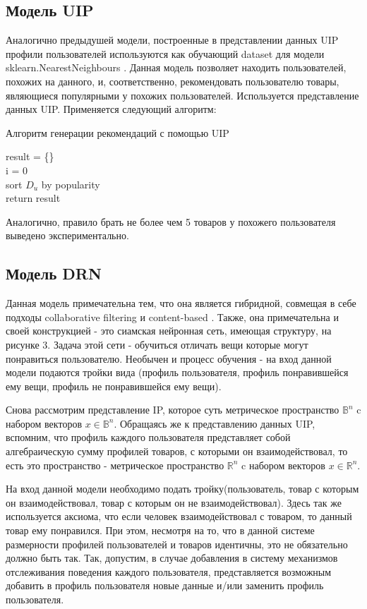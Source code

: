 \documentclass[14pt]{mmcs_article}
\begin{document}
\subsection{Модель UIP}
Аналогично предыдушей модели, построенные в представлении данных UIP профили пользователей используются как обучающий dataset для модели sklearn.NearestNeighbours \cite{IP:a1}. Данная модель позволяет находить пользователей, похожих на данного, и, соответственно, рекомендовать пользователю товары, являющиеся популярными у похожих пользователей. Используется представление данных UIP.
Применяется следующий алгоритм:

\begin{algorithm}[H]\label{UIP:1}
	\caption{Алгоритм генерации рекомендаций с помощью UIP}
	result = \{\} \\
	i = 0 \\
	sort $D_u$ by popularity\\
	return result
\end{algorithm}

Аналогично, правило брать не более чем 5 товаров у похожего пользователя выведено экспериментально.
\subsection{Модель DRN}
Данная модель примечательна тем, что она является гибридной, совмещая в себе подходы collaborative filtering и content-based \cite{DRN:a1}. Также, она примечательна и своей конструкцией - это сиамская нейронная сеть, имеющая структуру, на рисунке 3. Задача этой сети - обучиться отличать вещи которые могут понравиться пользователю. Необычен и процесс обучения - на вход данной модели подаются тройки вида (профиль пользователя, профиль понравившейся ему вещи, профиль не понравившейся ему вещи). 

Снова рассмотрим представление IP, которое суть метрическое пространство $\mathbb{B}^n$ c набором векторов $x \in \mathbb{B}^n$. Обращаясь же к представлению данных UIP, вспомним, что профиль каждого пользователя представляет собой алгебраическую сумму профилей товаров, с которыми он взаимодействовал, то есть это пространство - метрическое пространство $\mathbb{R}^n$ c набором векторов $x \in \mathbb{R}^n$.

На вход данной модели необходимо подать тройку(пользователь, товар с которым он взаимодействовал, товар с  которым он не взаимодействовал). Здесь так же используется аксиома, что если человек взаимодействовал с товаром, то данный товар ему понравился. При этом, несмотря на то, что в данной системе размерности профилей пользователей и товаров идентичны, это не обязательно должно быть так. Так, допустим, в случае добавления в систему механизмов отслеживания поведения каждого пользователя, представляется возможным добавить в профиль пользователя новые данные и/или заменить профиль пользователя. 
\end{document}
